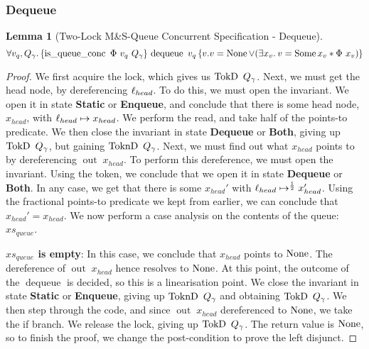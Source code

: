 \documentclass[a4paper, 11pt]{report}
\newtheorem{lemma}[theorem]{Lemma}
\newcommand{\dequeue}{\operatorname{dequeue}}
\newcommand{\isqueueconc}{\operatorname{is\_queue\_conc}}
\newcommand{\nOut}[1]{\operatorname{out} \; #1}
\newcommand{\StaticState}{\textbf{Static}}
\newcommand{\EnqueueState}{\textbf{Enqueue}}
\newcommand{\DequeueState}{\textbf{Dequeue}}
\newcommand{\BothState}{\textbf{Both}}
\newcommand{\Qg}{Q_\gname}
\newcommand{\TokD}[1]{\operatorname{TokD}\ #1}
\newcommand{\TokDQg}{\TokD{\Qg}}
\newcommand{\ToknD}[1]{\operatorname{ToknD}\ #1}
\newcommand{\ToknDQg}{\ToknD{\Qg}}
\newcommand{\tlconcspecdeq}{\All v_q, Q_\gname. \hoare{\isqueueconc \ \Phi \ v_q \ Q_\gname}{\dequeue\ v_q}{v . v = \None \lor (\Exists x_v. v = \Some x_v \star \Phi \ x_v)}}
\begin{document}
\subsubsection{Dequeue}
\begin{lemma}[Two-Lock M\&S-Queue Concurrent Specification - Dequeue]\label{TLMSQ:spec:conc:dequeue}
  \begin{equation*}
    \tlconcspecdeq
  \end{equation*}
\end{lemma}
\begin{proof}
We first acquire the lock, which gives us $\TokDQg$. Next, we must get the head node, by dereferencing $\ell_{head}$. To do this, we must open the invariant. We open it in state \StaticState{} or \EnqueueState{}, and conclude that there is some head node, $x_{head}$, with $\ell_{head} \mapsto x_{head}$. We perform the read, and take half of the points-to predicate. We then close the invariant in state \DequeueState{} or \BothState{}, giving up $\TokDQg$, but gaining $\ToknDQg$. Next, we must find out what $x_{head}$ points to by dereferencing $\nOut{x_{head}}$. To perform this dereference, we must open the invariant. Using the token, we conclude that we open it in state \DequeueState{} or \BothState{}. In any case, we get that there is some $x_{head}'$ with $\ell_{head} \mapsto^{\frac{1}{2}} x_{head}'$. Using the fractional points-to predicate we kept from earlier, we can conclude that $x_{head}' = x_{head}$. We now perform a case analysis on the contents of the queue: $xs_{queue}$.

\textbf{$xs_{queue}$ is empty}: In this case, we conclude that $x_{head}$ points to $\operatorname{None}$. The dereference of $\nOut{x_{head}}$ hence resolves to $\operatorname{None}$. At this point, the outcome of the $\dequeue$ is decided, so this is a linearisation point. We close the invariant in state \StaticState{} or \EnqueueState{}, giving up $\ToknDQg$ and obtaining $\TokDQg$. We then step through the code, and since $\nOut{x_{head}}$ dereferenced to $\operatorname{None}$, we take the if branch. We release the lock, giving up $\TokDQg$. The return value is $\operatorname{None}$, so to finish the proof, we change the post-condition to prove the left disjunct.


\end{proof}
\end{document}
